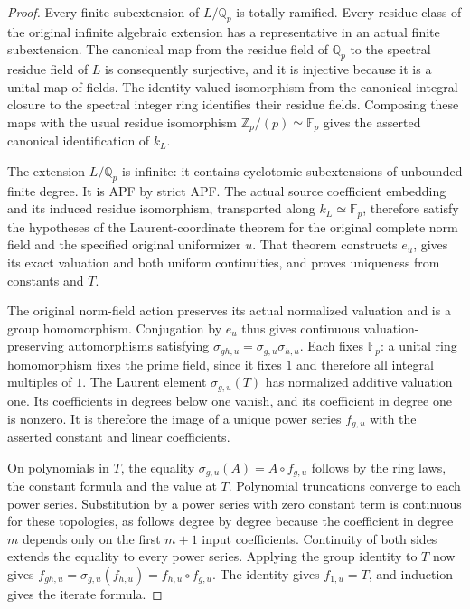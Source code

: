 \begin{proof}
Every finite subextension of $L/\mathbb Q_p$ is totally ramified.
Every residue class of the original infinite algebraic extension has a
representative in an actual finite subextension. The canonical map from
the residue field of $\mathbb Q_p$ to the spectral residue field of $L$
is consequently surjective, and it is injective because it is a unital
map of fields. The identity-valued isomorphism from the canonical integral
closure to the spectral integer ring identifies their residue fields.
Composing these maps with the usual residue isomorphism
$\mathbb Z_p/(p)\simeq\mathbb F_p$ gives the asserted canonical
identification of $k_L$.

The extension $L/\mathbb Q_p$ is infinite: it contains cyclotomic
subextensions of unbounded finite degree. It is APF by strict APF.
The actual source coefficient embedding and its induced residue
isomorphism, transported along $k_L\simeq\mathbb F_p$, therefore satisfy
the hypotheses of the Laurent-coordinate theorem for the original
complete norm field and the specified original uniformizer $u$.
That theorem constructs $e_u$, gives its exact valuation and both
uniform continuities, and proves uniqueness from constants and $T$.

The original norm-field action preserves its actual normalized valuation
and is a group homomorphism. Conjugation by $e_u$ thus gives continuous
valuation-preserving automorphisms satisfying
$\sigma_{gh,u}=\sigma_{g,u}\sigma_{h,u}$. Each fixes $\mathbb F_p$:
a unital ring homomorphism fixes the prime field, since it fixes $1$ and
therefore all integral multiples of $1$.
The Laurent element $\sigma_{g,u}(T)$ has normalized additive valuation
one. Its coefficients in degrees below one vanish, and its coefficient
in degree one is nonzero. It is therefore the image of a unique power
series $f_{g,u}$ with the asserted constant and linear coefficients.

On polynomials in $T$, the equality
$\sigma_{g,u}(A)=A\circ f_{g,u}$ follows by the ring laws, the constant
formula and the value at $T$. Polynomial truncations converge to each
power series. Substitution by a power series with zero constant term is
continuous for these topologies, as follows degree by degree because the
coefficient in degree $m$ depends only on the first $m+1$ input
coefficients. Continuity of both sides extends the equality to every
power series. Applying the group identity to $T$ now gives
$f_{gh,u}=\sigma_{g,u}(f_{h,u})=f_{h,u}\circ f_{g,u}$.
The identity gives $f_{1,u}=T$, and induction gives the iterate formula.
\end{proof}

